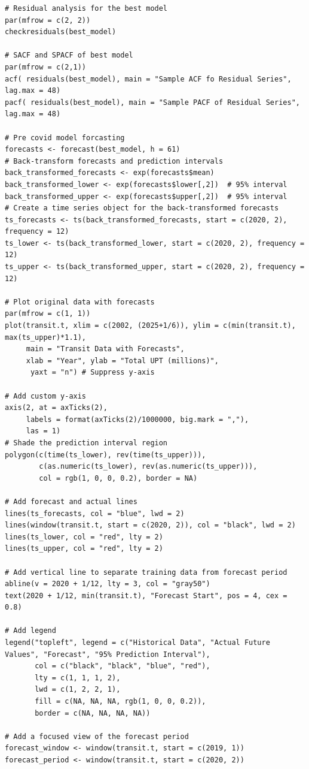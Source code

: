 \documentclass[11pt]{article}
\begin{document}
{\begin{verbatim}
# Residual analysis for the best model
par(mfrow = c(2, 2))
checkresiduals(best_model)

# SACF and SPACF of best model
par(mfrow = c(2,1))
acf( residuals(best_model), main = "Sample ACF fo Residual Series", lag.max = 48)
pacf( residuals(best_model), main = "Sample PACF of Residual Series", lag.max = 48)

# Pre covid model forcasting
forecasts <- forecast(best_model, h = 61)
# Back-transform forecasts and prediction intervals
back_transformed_forecasts <- exp(forecasts$mean)
back_transformed_lower <- exp(forecasts$lower[,2])  # 95% interval
back_transformed_upper <- exp(forecasts$upper[,2])  # 95% interval
# Create a time series object for the back-transformed forecasts
ts_forecasts <- ts(back_transformed_forecasts, start = c(2020, 2), frequency = 12)
ts_lower <- ts(back_transformed_lower, start = c(2020, 2), frequency = 12)
ts_upper <- ts(back_transformed_upper, start = c(2020, 2), frequency = 12)

# Plot original data with forecasts
par(mfrow = c(1, 1))
plot(transit.t, xlim = c(2002, (2025+1/6)), ylim = c(min(transit.t), max(ts_upper)*1.1),
     main = "Transit Data with Forecasts",
     xlab = "Year", ylab = "Total UPT (millions)",
      yaxt = "n") # Suppress y-axis

# Add custom y-axis
axis(2, at = axTicks(2),
     labels = format(axTicks(2)/1000000, big.mark = ","),
     las = 1)
# Shade the prediction interval region
polygon(c(time(ts_lower), rev(time(ts_upper))),
        c(as.numeric(ts_lower), rev(as.numeric(ts_upper))),
        col = rgb(1, 0, 0, 0.2), border = NA)

# Add forecast and actual lines
lines(ts_forecasts, col = "blue", lwd = 2)
lines(window(transit.t, start = c(2020, 2)), col = "black", lwd = 2)
lines(ts_lower, col = "red", lty = 2)
lines(ts_upper, col = "red", lty = 2)

# Add vertical line to separate training data from forecast period
abline(v = 2020 + 1/12, lty = 3, col = "gray50")
text(2020 + 1/12, min(transit.t), "Forecast Start", pos = 4, cex = 0.8)

# Add legend
legend("topleft", legend = c("Historical Data", "Actual Future Values", "Forecast", "95% Prediction Interval"),
       col = c("black", "black", "blue", "red"),
       lty = c(1, 1, 1, 2),
       lwd = c(1, 2, 2, 1),
       fill = c(NA, NA, NA, rgb(1, 0, 0, 0.2)),
       border = c(NA, NA, NA, NA))

# Add a focused view of the forecast period
forecast_window <- window(transit.t, start = c(2019, 1))
forecast_period <- window(transit.t, start = c(2020, 2))


\end{verbatim}}
\end{document}

